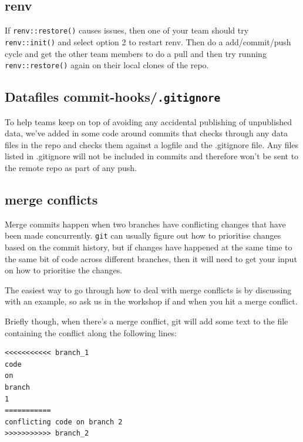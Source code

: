 \documentclass[
  12pt,
]{article}
\begin{document}
\hypertarget{renv}{%
\subsection{renv}\label{renv}}

If \texttt{renv::restore()} causes issues, then one of your team should
try \texttt{renv::init()} and select option 2 to restart renv. Then do a
add/commit/push cycle and get the other team members to do a pull and
then try running \texttt{renv::restore()} again on their local clones of
the repo.

\hypertarget{datafiles-commit-hooks.gitignore}{%
\subsection{\texorpdfstring{Datafiles
commit-hooks/\texttt{.gitignore}}{Datafiles commit-hooks/.gitignore}}\label{datafiles-commit-hooks.gitignore}}

To help teams keep on top of avoiding any accidental publishing of
unpublished data, we've added in some code around commits that checks
through any data files in the repo and checks them against a logfile and
the .gitignore file. Any files listed in .gitignore will not be included
in commits and therefore won't be sent to the remote repo as part of any
push.

\hypertarget{merge-conflicts-1}{%
\subsection{merge conflicts}\label{merge-conflicts-1}}

Merge commits happen when two branches have conflicting changes that
have been made concurrently. \texttt{git} can usually figure out how to
prioritise changes based on the commit history, but if changes have
happened at the same time to the same bit of code across different
branches, then it will need to get your input on how to prioritise the
changes.

The easiest way to go through how to deal with merge conflicts is by
discussing with an example, so ask us in the workshop if and when you
hit a merge conflict.

Briefly though, when there's a merge conflict, git will add some text to
the file containing the conflict along the following lines:

\begin{verbatim}
<<<<<<<<<<< branch_1
code 
on 
branch 
1
===========
conflicting code on branch 2
>>>>>>>>>>> branch_2
\end{verbatim}
\end{document}
